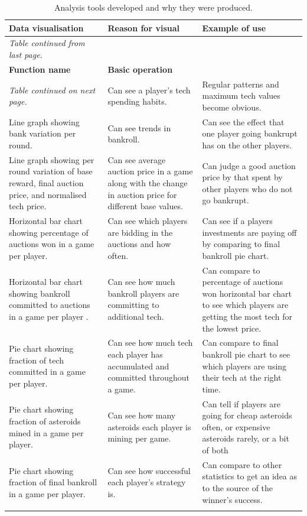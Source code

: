 \documentclass[11pt, twoside]{article}
\begin{document}
\begin{longtable}{p{}p{}p{}}
	\caption{Analysis tools developed and why they were produced.}\\
	\toprule \textbf{Data visualisation} & \textbf{Reason for visual} & \textbf{Example of use} \\ \midrule
	\endfirsthead
	\multicolumn{1}{l}{\textit{Table continued from last page.}}\\
	\toprule \textbf{Function name} & \textbf{Basic operation} \\ \midrule \endhead
	\bottomrule \multicolumn{1}{l}{\textit{Table continued on next page.}} \endfoot
	\bottomrule \endlastfoot
	Line graph showing tech variation per round (for all players). & Can see a player's tech spending habits. & Regular patterns and maximum tech values become obvious. \\
	Line graph showing bank variation per round. & Can see trends in bankroll. & Can see the effect that one player going bankrupt has on the other players. \\
	Line graph showing per round variation of base reward, final auction price, and normalised tech price. & Can see average auction price in a game along with the change in auction price for different base values. & Can judge a good auction price by that spent by other players who do not go bankrupt. \\
	Horizontal bar chart showing percentage of auctions won in a game per player. & Can see which players are bidding in the auctions and how often. & Can see if a players investments are paying off by comparing to final bankroll pie chart. \\
	Horizontal bar chart showing bankroll committed to auctions in a game per player .& Can see how much bankroll players are committing to additional tech. & Can compare to percentage of auctions won horizontal bar chart to see which players are getting the most tech for the lowest price. \\
	Pie chart showing fraction of tech committed in a game per player. & Can see how much tech each player has accumulated and committed throughout a game. & Can compare to final bankroll pie chart to see which players are using their tech at the right time. \\
	Pie chart showing fraction of asteroids mined in a game per player. & Can see how many asteroids each player is mining per game. & Can tell if players are going for cheap asteroids often, or expensive asteroids rarely, or a bit of both \\
	Pie chart showing fraction of final bankroll in a game per player. & Can see how successful each player's strategy is. & Can compare to other statistics to get an idea as to the source of the winner's success. \\
	\label{tab:analysis}
\end{longtable}
\end{document}
